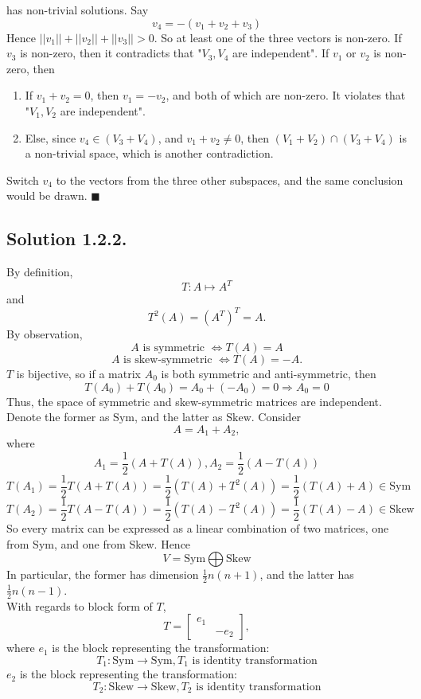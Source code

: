 \documentclass{article}
\begin{document}
\begin{enumerate}
    has non-trivial solutions. Say 
    \[v_4=-(v_1+v_2+v_3)\]
    Hence $||v_1||+||v_2||+||v_3||>0$. So at least one of the three vectors is non-zero. If $v_3$ is non-zero, then it contradicts that "$V_3,V_4$ are independent". If $v_1$ or $v_2$ is non-zero, then 
    \begin{enumerate}
        \item If $v_1+v_2=0$, then $v_1=-v_2$, and both of which are non-zero. It violates that "$V_1,V_2$ are independent".
        \item Else, since $v_4\in (V_3+V_4)$, and $v_1+v_2\neq 0$, then $(V_1+V_2)\cap (V_3+V_4)$ is a non-trivial space, which is another contradiction.  
    \end{enumerate}
    Switch $v_4$ to the vectors from the three other subspaces, and the same conclusion would be drawn. $\blacksquare$
\end{enumerate}
\subsection*{Solution 1.2.2.}
By definition, 
\[T:A\mapsto A^T\]
and
\[T^2(A) = (A^T)^T=A.\]
By observation, 
\[A\text{ is symmetric }\Leftrightarrow T(A)=A\]
\[A\text{ is skew-symmetric }\Leftrightarrow T(A)=-A.\]
$T$ is bijective, so if a matrix $A_0$ is both symmetric and anti-symmetric, then
\[T(A_0)+T(A_0)=A_0+(-A_0)=0\Rightarrow A_0=0\]
Thus, the space of symmetric and skew-symmetric matrices are independent. \\
Denote the former as $\mathrm{Sym}$, and the latter as $\mathrm{Skew}$.
Consider
\[A=A_1+A_2,\]
where
\[A_1=\frac{1}{2}(A+T(A)), A_2=\frac{1}{2}(A-T(A))\]
\[T(A_1)=\frac{1}{2}T(A+T(A))=\frac{1}{2}(T(A)+T^2(A))=\frac{1}{2}(T(A)+A)\in\mathrm{Sym}\]
\[T(A_2)=\frac{1}{2}T(A-T(A))=\frac{1}{2}(T(A)-T^2(A))=\frac{1}{2}(T(A)-A)\in\mathrm{Skew}\]
So every matrix can be expressed as a linear combination of two matrices, one from Sym, and one from Skew.
Hence 
\[V=\mathrm{Sym}\bigoplus\mathrm{Skew}\]
In particular, the former has dimension $\frac{1}{2}n(n+1)$, and the latter has $\frac{1}{2}n(n-1)$.\\

With regards to block form of $T$, \\
\[T=\left[\begin{array}{rr}
e_1 &  \\
     & -e_2
\end{array}\right],\]
where $e_1$ is the block representing the transformation:
\[T_1: \mathrm{Sym} \to \mathrm{Sym}, T_1\text{ is identity transformation}\]
$e_2$ is the block representing the transformation:
\[T_2: \mathrm{Skew} \to \mathrm{Skew}, T_2\text{ is identity transformation}\]
\end{document}
